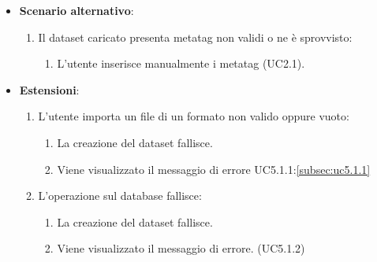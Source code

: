 \begin{itemize}
    \item \textbf{Scenario alternativo}:
		\begin{enumerate}
            \item Il dataset caricato presenta metatag non validi o ne è sprovvisto:
            \begin{enumerate}
                \item L'utente inserisce manualmente i metatag (UC2.1).
            \end{enumerate}
        \end{enumerate}
    \item \textbf{Estensioni}:
        \begin{enumerate}
            \item L'utente importa un file di un formato non valido oppure vuoto:
            \begin{enumerate}
                \item La creazione del dataset fallisce.
                \item Viene visualizzato il messaggio di errore UC5.1.1:\ref{subsec:uc5.1.1}
            \end{enumerate}
            \item L'operazione sul database fallisce:
            \begin{enumerate}
                \item La creazione del dataset fallisce.
                \item Viene visualizzato il messaggio di errore. (UC5.1.2)
            \end{enumerate}
        \end{enumerate}
\end{itemize}


